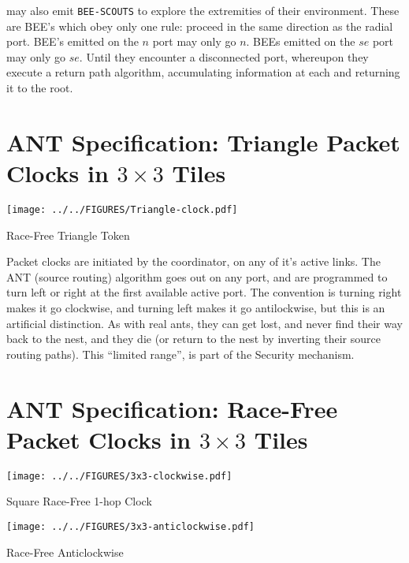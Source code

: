 \documentclass[../HFT-main.tex]{subfiles}
\begin{document}
\CELLs may also emit \texttt{BEE-SCOUTS} to explore the extremities of their environment. These are BEE's which obey only one rule: proceed in the same direction as the radial port.   BEE's  emitted on the $n$ port may only go $n$.  BEEs emitted on the $se$ port may only go $se$. Until they encounter a disconnected port, whereupon they execute a return path algorithm, accumulating information at each \CELL and returning it to the root.



\newpage
\section{ANT Specification: Triangle Packet Clocks in $3 \times 3$ Tiles}
 \begin{marginfigure}
        \texttt{[image: ../../FIGURES/Triangle-clock.pdf]} %
  \caption{Race-Free Triangle Token}
    \vspace{10pt}
\end{marginfigure}

Packet clocks are initiated by the coordinator, on any of it's active links.  The ANT (source routing) algorithm goes out on any port, and are programmed to turn left or right at the first available active port.  The convention is turning right makes it go clockwise, and turning left makes it go antilockwise, but this is an artificial distinction. As with real ants, they can get lost, and never find their way back to the nest, and they die (or return to the nest by inverting their source routing paths). This ``limited range'', is part of the Security mechanism. 

\section{ANT Specification: Race-Free Packet Clocks in $3 \times 3$ Tiles}
 \begin{marginfigure}
        \texttt{[image: ../../FIGURES/3x3-clockwise.pdf]} %
  \caption{Square Race-Free 1-hop Clock}
    \vspace{10pt}
\end{marginfigure}




 \begin{marginfigure}
        \texttt{[image: ../../FIGURES/3x3-anticlockwise.pdf]} %
  \caption{Race-Free Anticlockwise }
    \vspace{10pt}
\end{marginfigure}
\end{document}
